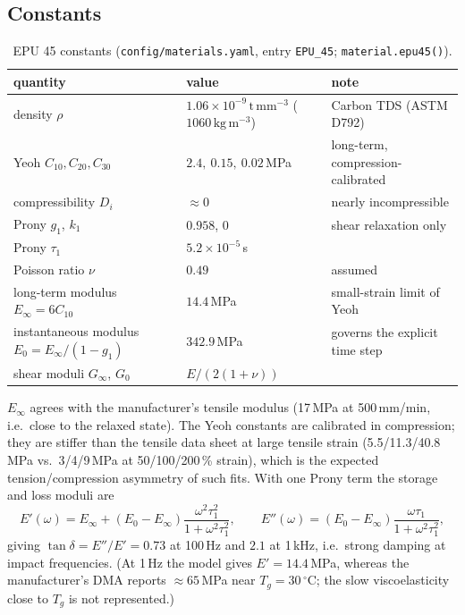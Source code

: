 \documentclass[11pt,a4paper]{article}
\begin{document}
\subsection{Constants}
\begin{table}[h]
\centering
\small
\begin{tabular}{p{}p{}p{}}
\toprule
quantity & value & note\\
\midrule
density $\rho$ & $1.06\times10^{-9}\,\mathrm{t\,mm^{-3}}$ ($1060\,\mathrm{kg\,m^{-3}}$) & Carbon TDS (ASTM D792)\\
Yeoh $C_{10}, C_{20}, C_{30}$ & $2.4,\ 0.15,\ 0.02$\,MPa & long-term, compression-calibrated\\
compressibility $D_i$ & $\approx 0$ & nearly incompressible\\
Prony $g_1$, $k_1$ & $0.958$, $0$ & shear relaxation only\\
Prony $\tau_1$ & $5.2\times 10^{-5}$\,s & \\
Poisson ratio $\nu$ & $0.49$ & assumed\\
long-term modulus $E_\infty = 6C_{10}$ & $14.4$\,MPa & small-strain limit of Yeoh\\
instantaneous modulus $E_0 = E_\infty/(1-g_1)$ & $342.9$\,MPa & governs the explicit time step\\
shear moduli $G_\infty$, $G_0$ & $E/(2(1+\nu))$ & \\
\bottomrule
\end{tabular}
\caption{EPU 45 constants (\texttt{config/materials.yaml}, entry \texttt{EPU\_45}; \texttt{material.epu45()}).}
\label{tab:material}
\end{table}

$E_\infty$ agrees with the manufacturer's tensile modulus (17\,MPa at 500\,mm/min, i.e.\ close to the relaxed
state). The Yeoh constants are calibrated in compression; they are stiffer than the tensile data sheet at large
tensile strain (5.5/11.3/40.8\,MPa vs.\ 3/4/9\,MPa at 50/100/200\,\% strain), which is the expected
tension/compression asymmetry of such fits. With one Prony term the storage and loss moduli are
\begin{equation}
E'(\omega) = E_\infty + (E_0-E_\infty)\frac{\omega^2\tau_1^2}{1+\omega^2\tau_1^2},\qquad
E''(\omega) = (E_0-E_\infty)\frac{\omega\tau_1}{1+\omega^2\tau_1^2},
\end{equation}
giving $\tan\delta = E''/E' = 0.73$ at 100\,Hz and $2.1$ at 1\,kHz, i.e.\ strong damping at impact
frequencies. (At 1\,Hz the model gives $E'=14.4$\,MPa, whereas the manufacturer's DMA reports
$\approx 65$\,MPa near $T_g=30\,^\circ$C; the slow viscoelasticity close to $T_g$ is not represented.)
\end{document}
